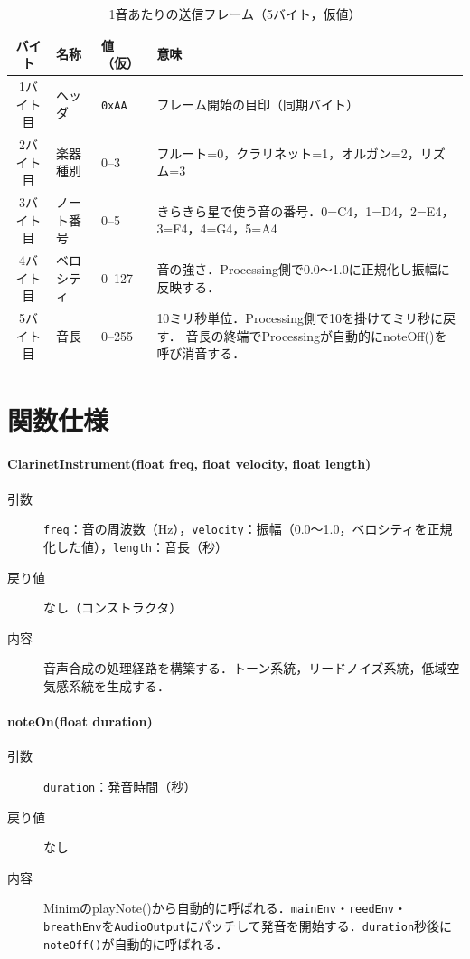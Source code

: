 \documentclass[uplatex,dvipdfmx,report]{jlreq}
\begin{document}
\begin{table}[H]
  \centering
  \caption{1音あたりの送信フレーム（5バイト，仮値）}
  \label{tab:proto}
  \small
  \begin{tabular}{c p{18mm} p{18mm} p{65mm}}
    \toprule
    バイト & 名称 & 値（仮） & 意味 \\
    \midrule
    1バイト目 & ヘッダ & \texttt{0xAA} &
      フレーム開始の目印（同期バイト） \\
    2バイト目 & 楽器種別 & 0--3 &
      フルート=0，クラリネット=1，オルガン=2，リズム=3 \\
    3バイト目 & ノート番号 & 0--5 &
      きらきら星で使う音の番号．0=C4，1=D4，2=E4，3=F4，4=G4，5=A4 \\
    4バイト目 & ベロシティ & 0--127 &
      音の強さ．Processing側で0.0〜1.0に正規化し振幅に反映する． \\
    5バイト目 & 音長 & 0--255 &
      10ミリ秒単位．Processing側で10を掛けてミリ秒に戻す．
      音長の終端でProcessingが自動的にnoteOff()を呼び消音する． \\
    \bottomrule
  \end{tabular}
\end{table}







\section{関数仕様}

\paragraph{ClarinetInstrument(float freq, float velocity, float length)}
\begin{description}
  \item[引数] \verb|freq|：音の周波数（Hz），\verb|velocity|：振幅（0.0〜1.0，ベロシティを正規化した値），\verb|length|：音長（秒）
  \item[戻り値] なし（コンストラクタ）
  \item[内容] 音声合成の処理経路を構築する．トーン系統，リードノイズ系統，低域空気感系統を生成する．
\end{description}

\paragraph{noteOn(float duration)}
\begin{description}
  \item[引数] \verb|duration|：発音時間（秒）
  \item[戻り値] なし
  \item[内容] MinimのplayNote()から自動的に呼ばれる．\verb|mainEnv|・\verb|reedEnv|・\verb|breathEnv|を\verb|AudioOutput|にパッチして発音を開始する．\verb|duration|秒後に\verb|noteOff()|が自動的に呼ばれる．
\end{description}
\end{document}
